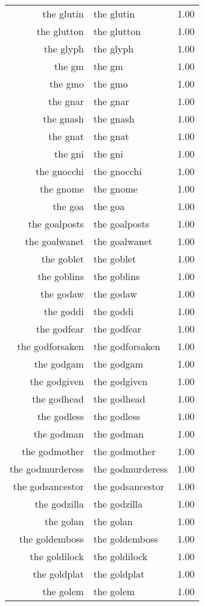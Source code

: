 \begin{table}[ht]
\begin{tabular}{rlr}
  the glutin & the glutin & 1.00 \\ 
  the glutton & the glutton & 1.00 \\ 
  the glyph & the glyph & 1.00 \\ 
  the gm & the gm & 1.00 \\ 
  the gmo & the gmo & 1.00 \\ 
  the gnar & the gnar & 1.00 \\ 
  the gnash & the gnash & 1.00 \\ 
  the gnat & the gnat & 1.00 \\ 
  the gni & the gni & 1.00 \\ 
  the gnocchi & the gnocchi & 1.00 \\ 
  the gnome & the gnome & 1.00 \\ 
  the goa & the goa & 1.00 \\ 
  the goalposts & the goalposts & 1.00 \\ 
  the goalwanet & the goalwanet & 1.00 \\ 
  the goblet & the goblet & 1.00 \\ 
  the goblins & the goblins & 1.00 \\ 
  the godaw & the godaw & 1.00 \\ 
  the goddi & the goddi & 1.00 \\ 
  the godfear & the godfear & 1.00 \\ 
  the godforsaken & the godforsaken & 1.00 \\ 
  the godgam & the godgam & 1.00 \\ 
  the godgiven & the godgiven & 1.00 \\ 
  the godhead & the godhead & 1.00 \\ 
  the godless & the godless & 1.00 \\ 
  the godman & the godman & 1.00 \\ 
  the godmother & the godmother & 1.00 \\ 
  the godmurderess & the godmurderess & 1.00 \\ 
  the godsancestor & the godsancestor & 1.00 \\ 
  the godzilla & the godzilla & 1.00 \\ 
  the golan & the golan & 1.00 \\ 
  the goldemboss & the goldemboss & 1.00 \\ 
  the goldilock & the goldilock & 1.00 \\ 
  the goldplat & the goldplat & 1.00 \\ 
  the golem & the golem & 1.00 \\ 

\end{tabular}
\end{table}
